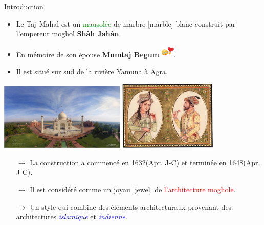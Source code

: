 \documentclass{beamer}
\begin{document}
\begin{frame}{Introduction}
\begin{itemize}[label=$\ast$]

    \item Le Taj Mahal est un \textcolor{green}{mausolée} de marbre [marble] blanc construit par l'empereur moghol \textbf{Shâh Jahân}.
    \item  En mémoire de son épouse \textbf{Mumtaj Begum} \includegraphics[width=0.05\textwidth]{heart-balloon-smiley.png}.
    \item  Il est situé sur sud de la rivière Yamuna à Agra.
\end{itemize}

  \includegraphics[width=0.45\textwidth]{tajmahal-drone1.jpg}  \quad \quad \quad   \includegraphics[width=0.35\textwidth]{tajmahal-S-M.jpg}  
  
  

\begin{itemize}
    \item[$\rightarrow$] La construction a commencé en 1632(Apr. J-C) et  terminée en 1648(Apr. J-C).
    \item[$\rightarrow$] Il est considéré comme un joyau [jewel] de \textcolor{red}{l'architecture moghole}.
    \item[$\rightarrow$] Un style qui combine des éléments architecturaux provenant des architectures \textcolor{blue}{\textit{islamique}} et \textcolor{blue}{\textit{indienne}}.
\end{itemize}
 
\end{frame}
 
\end{document}
